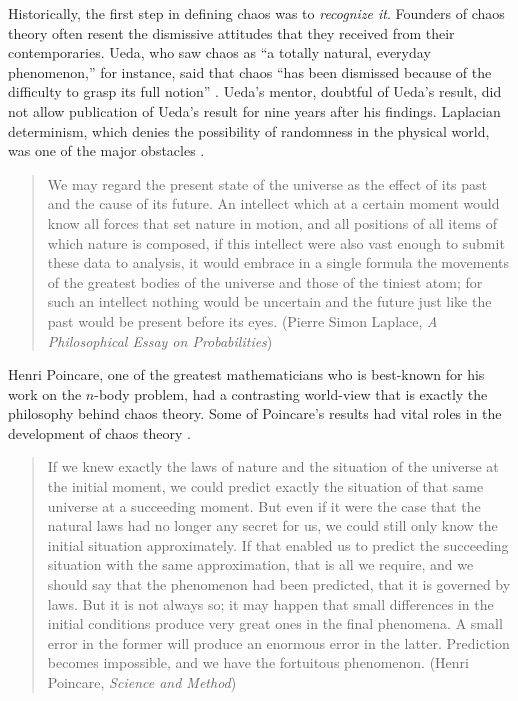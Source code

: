 \documentclass[10pt,twoside,draft]{book}
\begin{document}
Historically, the first step in defining chaos was to \textit{recognize it}.
Founders of chaos theory often resent the dismissive attitudes that they received from their contemporaries.
Ueda, who saw chaos as ``a totally natural, everyday phenomenon,'' for instance, said that chaos ``has been dismissed because of the difficulty to grasp its full notion'' \citep[p.533]{gleick}.
Ueda's mentor, doubtful of Ueda's result, did not allow publication of Ueda's result for nine years after his findings.
Laplacian determinism, which denies the possibility of randomness in the physical world, was one of the major obstacles \citep{stone}.
\begin{quotation}
  We may regard the present state of the universe as the effect of its past and the cause of its future. An intellect which at a certain moment would know all forces that set nature in motion, and all positions of all items of which nature is composed, if this intellect were also vast enough to submit these data to analysis, it would embrace in a single formula the movements of the greatest bodies of the universe and those of the tiniest atom; for such an intellect nothing would be uncertain and the future just like the past would be present before its eyes.
  (Pierre Simon Laplace, \textit{A Philosophical Essay on Probabilities})
\end{quotation}
Henri Poincare, one of the greatest mathematicians who is best-known for his work on the $n$-body problem, had a contrasting world-view that is exactly the philosophy behind chaos theory.
Some of Poincare's results had vital roles in the development of chaos theory \citep[p.202]{ueda-abraham}.
\begin{quotation}
  If we knew exactly the laws of nature and the situation of the universe at the initial moment, we could predict exactly the situation of that same universe at a succeeding moment. But even if it were the case that the natural laws had no longer any secret for us, we could still only know the initial situation approximately. If that enabled us to predict the succeeding situation with the same approximation, that is all we require, and we should say that the phenomenon had been predicted, that it is governed by laws. But it is not always so; it may happen that small differences in the initial conditions produce very great ones in the final phenomena. A small error in the former will produce an enormous error in the latter. Prediction becomes impossible, and we have the fortuitous phenomenon.
  (Henri Poincare, \textit{Science and Method})
\end{quotation}
\end{document}
